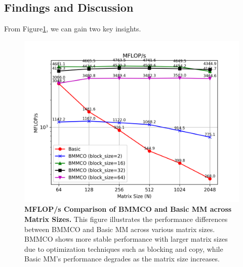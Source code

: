 \subsection{Findings and Discussion}
\label{subsec:findings-and-discussion}

From Figure\ref{fig:mflops-BMMCO-Basic}, we can gain two key insights.

\begin{figure}
    \centering
    \includegraphics[width=1.0\linewidth]{images/BMMCO-and-Basic_MFLOPs.png}
    \caption{\textbf{MFLOP/s Comparison of BMMCO and Basic MM across Matrix Sizes.} This figure illustrates the performance differences between BMMCO and Basic MM across various matrix sizes. BMMCO shows more stable performance with larger matrix sizes due to optimization techniques such as blocking and copy, while Basic MM's performance degrades as the matrix size increases.}
    \label{fig:mflops-BMMCO-Basic}
\end{figure}

\FloatBarrier
